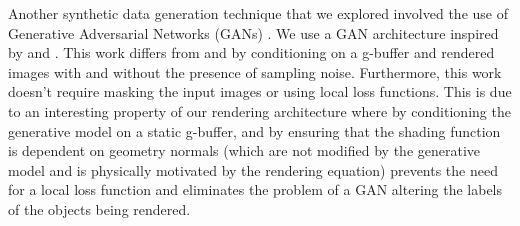 \documentclass[10pt,twocolumn,letterpaper]{article}
\newcommand{\tompson}[1]{{\color{green} JT: #1}}
\begin{document}
Another synthetic data generation technique that we explored involved the use of Generative Adversarial Networks (GANs) \cite{2014arXiv1409.7495G}.  We use a GAN architecture inspired by \cite{DBLP:journals/corr/ShrivastavaPTSW16} and \cite{Bousmalis2016UnsupervisedPD}. This work differs from \cite{Bousmalis2016UnsupervisedPD} and \cite{DBLP:journals/corr/ShrivastavaPTSW16} by conditioning on a g-buffer and rendered images with and without the presence of sampling noise. Furthermore, this work doesn't require masking the input images or using local loss functions. This is due to an interesting property of our rendering architecture where by conditioning the generative model on a static g-buffer, and by ensuring that the shading function is dependent on geometry normals (which are not modified by the generative model and is physically motivated by the rendering equation) 
prevents the need for a local loss function and eliminates the problem of a GAN altering the labels of the objects being rendered.
\end{document}
